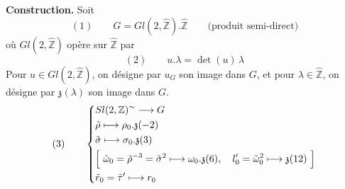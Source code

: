 \documentclass[11pt,a4paper]{article}
\begin{document}
\textbf{Construction.} Soit
\[
(1) \qquad G = Gl(2, \widehat{\mathbb{Z}}) . \widehat{\mathbb{Z}} \qquad \text{(produit semi-direct)}
\]
où $Gl(2, \widehat{\mathbb{Z}})$ opère sur $\widehat{\mathbb{Z}}$ par
\[
(2) \qquad u . \lambda = \det(u)\,\lambda
\]
 Pour $u \in Gl(2, \widehat{\mathbb{Z}})$, on désigne par $u_G$ son image dans $G$, et pour $\lambda \in \widehat{\mathbb{Z}}$, on désigne par $\mathfrak{z}(\lambda)$ son image dans $G$.
\[
(3) \qquad
\left\{
\begin{aligned}
&Sl(2, \mathbb{Z})^{\sim} \longrightarrow G \\
&\tilde\rho \longmapsto \rho_0 . \mathfrak{z}(-2) \\
&\tilde\sigma \longmapsto \sigma_0 . \mathfrak{z}(3) \\
&\Bigl[\ \tilde\omega_0 = \tilde\rho^{-3} = \tilde\sigma^2 \longmapsto \omega_0 . \mathfrak{z}(6), \quad
l'_0 = \tilde\omega_0^{2} \longmapsto \mathfrak{z}(12)\ \Bigr] \\
&\tilde r_0 = \tilde\tau' \longmapsto r_0
\end{aligned}
\right.
\]
\end{document}

